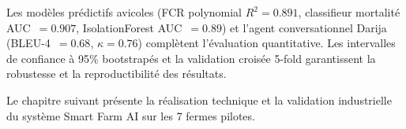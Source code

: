 Les modèles prédictifs avicoles (FCR polynomial $R^2 = 0.891$, classifieur mortalité
AUC~$= 0.907$, IsolationForest AUC~$= 0.89$) et l'agent conversationnel Darija
(BLEU-4~$= 0.68$, $\kappa = 0.76$) complètent l'évaluation quantitative. Les
intervalles de confiance à 95\% bootstrapés et la validation croisée 5-fold
garantissent la robustesse et la reproductibilité des résultats.

Le chapitre suivant présente la réalisation technique et la validation industrielle
du système Smart Farm AI sur les 7 fermes pilotes.

